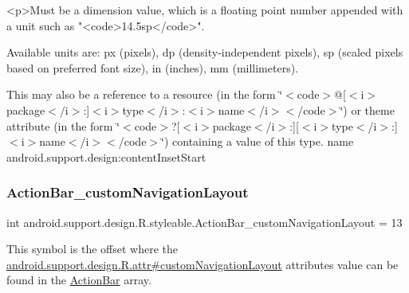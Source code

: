 \begin{DoxyVerb}      <p>Must be a dimension value, which is a floating point number appended with a unit such as "<code>14.5sp</code>".
\end{DoxyVerb}
 Available units are\+: px (pixels), dp (density-\/independent pixels), sp (scaled pixels based on preferred font size), in (inches), mm (millimeters). 

This may also be a reference to a resource (in the form \char`\"{}$<$code$>$@\mbox{[}$<$i$>$package$<$/i$>$\+:\mbox{]}$<$i$>$type$<$/i$>$\+:$<$i$>$name$<$/i$>$$<$/code$>$\char`\"{}) or theme attribute (in the form \char`\"{}$<$code$>$?\mbox{[}$<$i$>$package$<$/i$>$\+:\mbox{]}\mbox{[}$<$i$>$type$<$/i$>$\+:\mbox{]}$<$i$>$name$<$/i$>$$<$/code$>$\char`\"{}) containing a value of this type.  name android.\+support.\+design\+:content\+Inset\+Start \mbox{\label{classandroid_1_1support_1_1design_1_1R_1_1styleable_a89b2c279c58515d140466f1c0f360aa1}} 
\subsubsection{\texorpdfstring{Action\+Bar\+\_\+custom\+Navigation\+Layout}{ActionBar\_customNavigationLayout}}
{\footnotesize\ttfamily int android.\+support.\+design.\+R.\+styleable.\+Action\+Bar\+\_\+custom\+Navigation\+Layout = 13\hspace{0.3cm}{\ttfamily [static]}}

This symbol is the offset where the \hyperlink{classandroid_1_1support_1_1design_1_1R_1_1attr_a9d78ff9bcc69bcb05b0d75f4988d0db9}{android.\+support.\+design.\+R.\+attr\#custom\+Navigation\+Layout} attribute\textquotesingle{}s value can be found in the \hyperlink{classandroid_1_1support_1_1design_1_1R_1_1styleable_ab795220a96557d11f8c21359b95bed82}{Action\+Bar} array.

